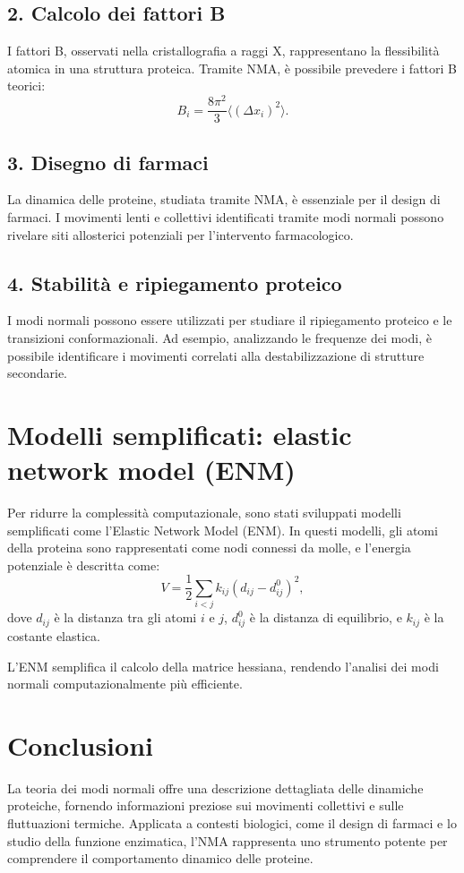 \documentclass[Lau,binding=0.6cm,oneside,noexaminfo]{sapthesis}
\begin{document}
\subsection*{2. Calcolo dei fattori B}
I fattori B, osservati nella cristallografia a raggi X, rappresentano la flessibilità atomica in una struttura proteica. Tramite NMA, è possibile prevedere i fattori B teorici:
\[
B_i = \frac{8 \pi^2}{3} \langle (\Delta x_i)^2 \rangle.
\]

\subsection*{3. Disegno di farmaci}
La dinamica delle proteine, studiata tramite NMA, è essenziale per il design di farmaci. I movimenti lenti e collettivi identificati tramite modi normali possono rivelare siti allosterici potenziali per l’intervento farmacologico.

\subsection*{4. Stabilità e ripiegamento proteico}
I modi normali possono essere utilizzati per studiare il ripiegamento proteico e le transizioni conformazionali. Ad esempio, analizzando le frequenze dei modi, è possibile identificare i movimenti correlati alla destabilizzazione di strutture secondarie.

\section{Modelli semplificati: elastic network model (ENM)}

Per ridurre la complessità computazionale, sono stati sviluppati modelli semplificati come l’Elastic Network Model (ENM). In questi modelli, gli atomi della proteina sono rappresentati come nodi connessi da molle, e l’energia potenziale è descritta come:
\[
V = \frac{1}{2} \sum_{i<j} k_{ij} (d_{ij} - d_{ij}^0)^2,
\]
dove $d_{ij}$ è la distanza tra gli atomi $i$ e $j$, $d_{ij}^0$ è la distanza di equilibrio, e $k_{ij}$ è la costante elastica.

L’ENM semplifica il calcolo della matrice hessiana, rendendo l’analisi dei modi normali computazionalmente più efficiente.

\section{Conclusioni}
La teoria dei modi normali offre una descrizione dettagliata delle dinamiche proteiche, fornendo informazioni preziose sui movimenti collettivi e sulle fluttuazioni termiche. Applicata a contesti biologici, come il design di farmaci e lo studio della funzione enzimatica, l'NMA rappresenta uno strumento potente per comprendere il comportamento dinamico delle proteine.
\end{document}
